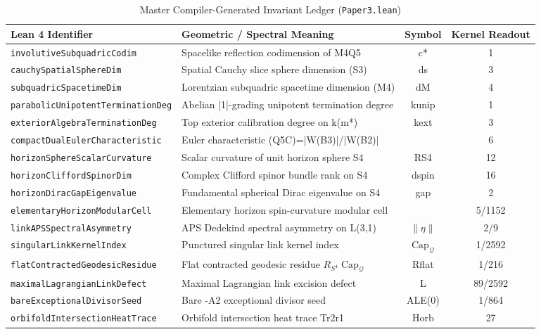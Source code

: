 \documentclass[11pt,reqno]{amsart}
\theoremstyle{definition}
\theoremstyle{remark}
\newcommand{\CapQ}{\operatorname{Cap}_{\mathcal{Q}}}
\begin{document}
\begin{table}[htbp]
\centering
\caption{Master Compiler-Generated Invariant Ledger (\texttt{Paper3.lean})}
\label{tab:paper3_ledger}
\renewcommand{\arraystretch}{1.16}
\begin{tabular}{@{}llcc@{}}
\toprule
\textbf{Lean 4 Identifier} & \textbf{Geometric / Spectral Meaning} & \textbf{Symbol} & \textbf{Kernel Readout} \\
\midrule
\texttt{involutiveSubquadricCodim} & Spacelike reflection codimension of M4Q5 & c* & 1 \\
\texttt{cauchySpatialSphereDim} & Spatial Cauchy slice sphere dimension (S3) & ds & 3 \\
\texttt{subquadricSpacetimeDim} & Lorentzian subquadric spacetime dimension (M4) & dM & 4 \\
\texttt{parabolicUnipotentTerminationDeg} & Abelian |1|-grading unipotent termination degree & kunip & 1 \\
\texttt{exteriorAlgebraTerminationDeg} & Top exterior calibration degree on k(m*) & kext & 3 \\
\texttt{compactDualEulerCharacteristic} & Euler characteristic (Q5C)=|W(B3)|/|W(B2)| &  & 6 \\
\texttt{horizonSphereScalarCurvature} & Scalar curvature of unit horizon sphere S4 & RS4 & 12 \\
\texttt{horizonCliffordSpinorDim} & Complex Clifford spinor bundle rank on S4 & dspin & 16 \\
\texttt{horizonDiracGapEigenvalue} & Fundamental spherical Dirac eigenvalue on S4 & gap & 2 \\
\texttt{elementaryHorizonModularCell} & Elementary horizon spin-curvature modular cell &  & 5/1152 \\
\texttt{linkAPSSpectralAsymmetry} & APS Dedekind spectral asymmetry on L(3,1) & $\|\eta\|$ & 2/9 \\
\texttt{singularLinkKernelIndex} & Punctured singular link kernel index & $\CapQ$ & 1/2592 \\
\texttt{flatContractedGeodesicResidue} & Flat contracted geodesic residue $R_{S^4}\CapQ$ & Rflat & 1/216 \\
\texttt{maximalLagrangianLinkDefect} & Maximal Lagrangian link excision defect & L & 89/2592 \\
\texttt{bareExceptionalDivisorSeed} & Bare -A2 exceptional divisor seed & ALE(0) & 1/864 \\
\texttt{orbifoldIntersectionHeatTrace} & Orbifold intersection heat trace Tr2r1 & Horb & 27 \\

\end{tabular}
\end{table}
\end{document}
